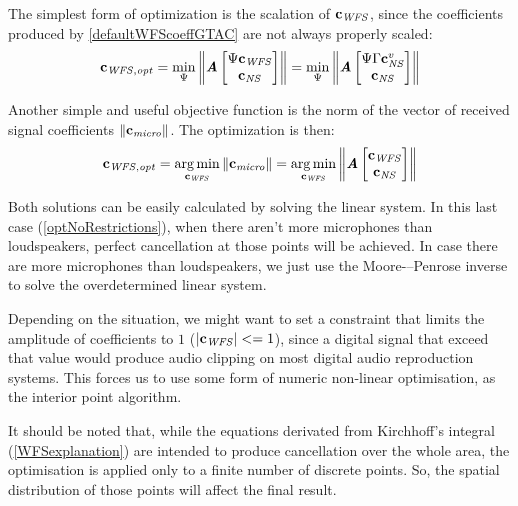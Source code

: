 The simplest form of optimization is the scalation of $\mathbf{c}_{\mathit{WFS}}$, since the coefficients produced by \autoref{defaultWFScoeffGTAC} are not always properly scaled:
\begin{equation}
	\vec{c}_{\mathit{WFS}, \mathit{opt}} =
	\min_{\Psi}
	\norm{\myMatrix{A}
		\begin{bmatrix}
			\Psi \vec{c_\mathit{WFS}}\\
			\vec{c_\mathit{NS}}\\
		\end{bmatrix}
	} = \min_{\Psi}
\norm{\myMatrix{A}
\begin{bmatrix}
	\Psi \wfsNormCoef[mat] \cns^v\\
	\vec{c_\mathit{NS}}\\
\end{bmatrix}
}\label{OptScalation}
\end{equation}

Another simple and useful objective function is the norm of the vector of received signal coefficients $\left\| \mathbf{c_\mathit{micro}} \right\|$. The optimization is then:
\begin{equation}
\mathbf{c_{\mathit{WFS}, \mathit{opt}}} =
\operatorname*{arg\,min}_{\mathbf{c_\mathit{WFS}}}
\left\| \mathbf{c_\mathit{micro}} \right\| =
\operatorname*{arg\,min}_{\mathbf{c_\mathit{WFS}}}
\left\| \bm{\mathit{A}}
\begin{bmatrix}
\mathbf{c_\mathit{WFS}}\\
\mathbf{c_\mathit{NS}}\\
\end{bmatrix}
 \right\|
\label{optNoRestrictions}
\end{equation}

Both solutions can be easily calculated by solving the linear system. In this last case (\autoref{optNoRestrictions}), when there aren't more microphones than loudspeakers, perfect cancellation at those points will be achieved. In case there are more microphones than loudspeakers, we just use the Moore-–Penrose inverse to solve the overdetermined linear system.

Depending on the situation, we might want to set a constraint that limits the amplitude of coefficients to $1$ ($\left | \mathbf{c}_{\mathit{WFS}} \right | <= 1$), since a digital signal that exceed that value would produce audio clipping on most digital audio reproduction systems. This forces us to use some form of numeric non-linear optimisation, as the interior point algorithm.

It should be noted that, while the equations derivated from Kirchhoff's integral (\autoref{WFSexplanation}) are intended to produce cancellation over the whole area, the optimisation is applied only to a finite number of discrete points. So, the spatial distribution of those points will affect the final result.


